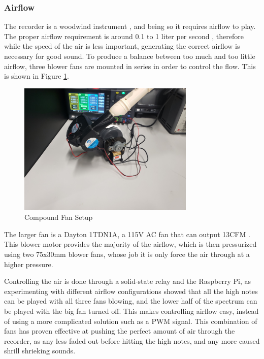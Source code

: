 \documentclass[UTF8, 12pt]{article}
\begin{document}
\subsubsection{Airflow}
    The recorder is a woodwind instrument \cite{rec_wiki}, and being so it requires airflow to play. The proper airflow requirement is around 0.1 to 1 liter per second \cite{rec_info}, therefore while the speed of the air is less important, generating the correct airflow is necessary for good sound. To produce a balance between too much and too little airflow, three blower fans are mounted in series in order to control the flow. This is shown in Figure \ref{fan_fig}.
    \begin{figure}[h]
        \centering
        \includegraphics[width=0.75\textwidth]{fans.png}
        \caption{Compound Fan Setup}
        \label{fan_fig}
    \end{figure}
    The larger fan is a Dayton 1TDN1A, a 115V AC fan that can output 13CFM \cite{fan_info}. This blower motor provides the majority of the airflow, which is then pressurized using two 75x30mm blower fans, whose job it is only force the air through at a higher pressure. 

    Controlling the air is done through a solid-state relay and the Raspberry Pi, as experimenting with different airflow configurations showed that all the high notes can be played with all three fans blowing, and the lower half of the spectrum can be played with the big fan turned off. This makes controlling airflow easy, instead of using a more complicated solution such as a PWM signal. This combination of fans has proven effective at pushing the perfect amount of air through the recorder, as any less faded out before hitting the high notes, and any more caused shrill shrieking sounds.
\end{document}
